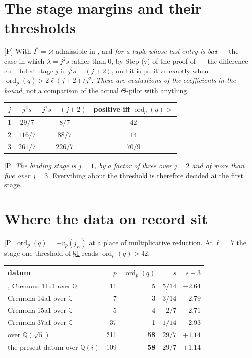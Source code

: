\documentclass[11pt]{article}
\theoremstyle{plain}
\theoremstyle{definition}
\newcommand{\ord}{\operatorname{ord}}
\begin{document}
\section{The stage margins and their thresholds}\label{s:margin}

\textup{[P]} With $I^{*}=\varnothing$ admissible in \cite[Prop.~1.4(iii)]{IUT4}, and
\emph{for a tuple whose last entry is bad} --- the case in which $\lambda=j^2s$ rather
than $0$, by Step (v) of the proof of \cite[Thm.~1.10]{IUT4} --- the difference
$\mathrm{co}-\mathrm{bd}$ at stage $j$ is $j^2s-(j+2)$, and it is positive exactly when
$\ord_p(q)>2\ell(j+2)/j^2$.  \emph{These are evaluations of the coefficients in the
bound}, not a comparison of the actual $\Theta$-pilot with anything.

\begin{center}
\begin{tabular}{cccc}
\toprule
$j$ & $j^2s$ & $j^2s-(j+2)$ & positive iff $\ord_p(q)>$\\
\midrule
1 & $29/7$  & $8/7$   & $42$\\
2 & $116/7$ & $88/7$  & $14$\\
3 & $261/7$ & $226/7$ & $70/9$\\
\bottomrule
\end{tabular}
\end{center}

\textup{[P]} \emph{The binding stage is $j=1$, by a factor of three over $j=2$ and of
more than five over $j=3$.}  Everything about the threshold is therefore decided at
the first stage.

\section{Where the data on record sit}\label{s:regime}

\textup{[P]} $\ord_p(q)=-v_p(j_{E})$ at a place of multiplicative reduction.  At
$\ell=7$ the stage-one threshold of \S\ref{s:margin} reads $\ord_p(q)>42$.

\begin{center}
\begin{tabular}{lrrrr}
\toprule
datum & $p$ & $\ord_p(q)$ & $s$ & $s-3$\\
\midrule
\cite{DH25}, Cremona 11a1 over $\mathbb{Q}$ & 11 & 5 & $5/14$ & $-2.64$\\
Cremona 14a1 over $\mathbb{Q}$ & 7 & 3 & $3/14$ & $-2.79$\\
Cremona 15a1 over $\mathbb{Q}$ & 5 & 4 & $2/7$  & $-2.71$\\
Cremona 37a1 over $\mathbb{Q}$ & 37 & 1 & $1/14$ & $-2.93$\\
\cite{First} over $\mathbb{Q}(\sqrt5)$ & 211 & \textbf{58} & $29/7$ & $\mathbf{+1.14}$\\
the present datum over $\mathbb{Q}(i)$ & 109 & \textbf{58} & $29/7$ & $\mathbf{+1.14}$\\
\bottomrule
\end{tabular}
\end{center}
\end{document}
